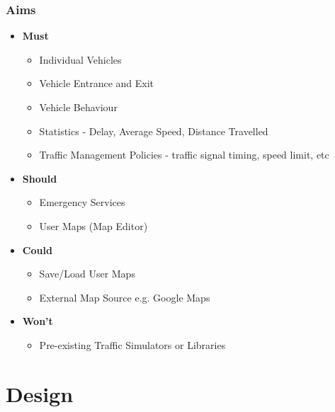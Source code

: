 \documentclass{beamer}
\begin{document}
\begin{frame}
\frametitle{Aims }

\begin{itemize}
\item \textbf{Must}
	\begin{itemize}
		\item Individual Vehicles
		\item Vehicle Entrance and Exit 
		\item Vehicle Behaviour
		\item Statistics - Delay, Average Speed, Distance Travelled
		\item Traffic Management Policies - traffic signal timing, speed limit, etc
\end{itemize}

\item \textbf{Should}
	\begin{itemize}
		\item Emergency Services
		\item User Maps (Map Editor)
	\end{itemize}
\item \textbf{Could}
	\begin{itemize}
		\item Save/Load User Maps
		\item External Map Source e.g. Google Maps
		\end{itemize}
\item \textbf{Won't}
	\begin{itemize}
		\item Pre-existing Traffic Simulators or Libraries
	\end{itemize}	
\end{itemize}

\end{frame}

\section{Design}
\end{document}
